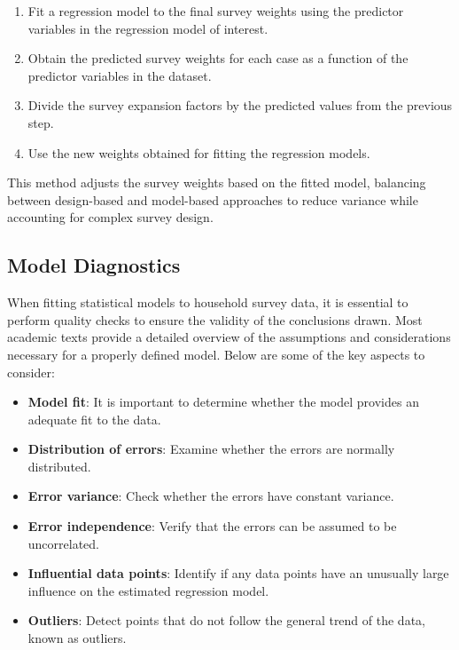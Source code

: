 \documentclass[
  12pt,
]{book}
\providecommand{\tightlist}{%
  \setlength{\itemsep}{0pt}\setlength{\parskip}{0pt}}
\begin{document}
\begin{enumerate}
\def\labelenumi{\arabic{enumi}.}
\tightlist
\item
  Fit a regression model to the final survey weights using the predictor variables in the regression model of interest.
\item
  Obtain the predicted survey weights for each case as a function of the predictor variables in the dataset.
\item
  Divide the survey expansion factors by the predicted values from the previous step.
\item
  Use the new weights obtained for fitting the regression models.
\end{enumerate}

This method adjusts the survey weights based on the fitted model, balancing between design-based and model-based approaches to reduce variance while accounting for complex survey design.

\hypertarget{model-diagnostics}{%
\subsection{Model Diagnostics}\label{model-diagnostics}}

When fitting statistical models to household survey data, it is essential to perform quality checks to ensure the validity of the conclusions drawn. Most academic texts provide a detailed overview of the assumptions and considerations necessary for a properly defined model. Below are some of the key aspects to consider:

\begin{itemize}
\tightlist
\item
  \textbf{Model fit}: It is important to determine whether the model provides an adequate fit to the data.
\item
  \textbf{Distribution of errors}: Examine whether the errors are normally distributed.
\item
  \textbf{Error variance}: Check whether the errors have constant variance.
\item
  \textbf{Error independence}: Verify that the errors can be assumed to be uncorrelated.
\item
  \textbf{Influential data points}: Identify if any data points have an unusually large influence on the estimated regression model.
\item
  \textbf{Outliers}: Detect points that do not follow the general trend of the data, known as outliers.
\end{itemize}
\end{document}
